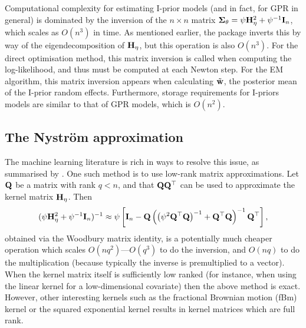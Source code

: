 Computational complexity for estimating I-prior models (and in fact, for GPR in general) is dominated by the inversion of the $n \times n$ matrix ${\bm\Sigma}_\theta = \psi{\mathbf H}_\eta^2 + \psi^{-1}{\mathbf I}_n$, which scales as $O(n^3)$ in time.
As mentioned earlier, the  package inverts this by way of the eigendecomposition of ${\mathbf H}_\eta$, but this operation is also $O(n^3)$.
For the direct optimisation method, this matrix inversion is called when computing the log-likelihood, and thus must be computed at each Newton step.
For the EM algorithm, this matrix inversion appears when calculating $\tilde {{\mathbf w}}$, the posterior mean of the I-prior random effects.
Furthermore, storage requirements for I-priors models are similar to that of GPR models, which is $O(n^2)$.

\subsection[The Nystrom approximation]{The Nyström approximation}

The machine learning literature is rich in ways to resolve this issue, as summarised by \cite{quinonero2005unifying}.
One such method is to use low-rank matrix approximations.
Let ${\mathbf Q}$ be a matrix with rank $q < n$, and that ${\mathbf Q}{\mathbf Q}^\top$ can be used to approximate the kernel matrix ${\mathbf H}_\eta$.
Then
%
\[
  (\psi{\mathbf H}_\eta^2 + \psi^{-1}{\mathbf I}_n)^{-1} \approx
  \psi\left[
  {\mathbf I}_n -
  {\mathbf Q}\left( \big(\psi^2{\mathbf Q}^\top{\mathbf Q}\big)^{-1} +{\mathbf Q}^\top{\mathbf Q} \right)^{-1} {\mathbf Q}^\top
  \right],
\]
%
obtained via the Woodbury matrix identity, is a potentially much cheaper operation which scales $O(nq^2)$---$O(q^3)$ to do the inversion, and $O(nq)$ to do the multiplication (because typically the inverse is premultiplied to a vector).
When the kernel matrix itself is sufficiently low ranked (for instance, when using the linear kernel for a low-dimensional covariate) then the above method is exact.
However, other interesting kernels such as the fractional Brownian motion (fBm) kernel or the squared exponential kernel results in kernel matrices which are full rank.

